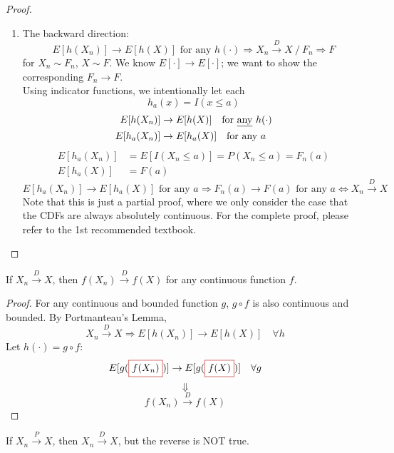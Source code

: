 \begin{proof}
\begin{enumerate}
        \item The backward direction:
        \[E[h(X_n)] \to E[h(X)] \text{ for any } h(\cdot) \Rightarrow X_n \overset{D}{\longrightarrow} X \ / \ F_n \Rightarrow F\]
        for $X_n \sim F_n$, $X \sim F$.
        We know $E[\cdot] \to E[\cdot]$; we want to show the corresponding $F_n \to F$.
        \\Using indicator functions, we intentionally let each
        \[h_a(x) = I(x \leq a)\]
        \begin{align*}
            E[h(X_n)] &\to E[h(X)] \quad \text{for \underline{any} } h(\cdot)\\
            E[h_a(X_n)] &\to E[h_a(X)] \quad \text{for any } a
        \end{align*}
        \begin{align*}
            E[h_a(X_n)] &= E[I(X_n \leq a)] = P(X_n \leq a) = F_n(a)\\
            E[h_a(X)] &= F(a)
        \end{align*}
        \[E[h_a(X_n)] \to E[h_a(X)] \text{ for any } a \Rightarrow F_n(a) \to F(a) \text{ for any } a \Leftrightarrow X_n \overset{D}{\longrightarrow} X\]
        Note that this is just a partial proof, where we only consider the case that the CDFs are always absolutely continuous. For the complete proof, please refer to the 1st recommended textbook.
    \end{enumerate}
\end{proof}

\begin{corollary}
    If $X_n \overset{D}{\longrightarrow} X$, then $f(X_n) \overset{D}{\longrightarrow} f(X)$ for any continuous function $f$.
    \begin{proof}
        For any continuous and bounded function $g$, $g \circ f$ is also continuous and bounded. By Portmanteau's Lemma,
        \[X_n \overset{D}{\longrightarrow} X \Rightarrow E[h(X_n)] \to E[h(X)] \quad \forall h\]
        Let $h(\cdot) = g \circ f$:
        \[E[g(\fcolorbox{red!70!black}{white}{$f(X_n)$})] \to E[g(\fcolorbox{red!70!black}{white}{$f(X)$})] \quad \forall g\]
        \[\Downarrow\]
        \[f(X_n) \overset{D}{\longrightarrow} f(X)\]
    \end{proof}
\end{corollary}

\begin{corollary}[][7.3.2]
    If $X_n \overset{P}{\longrightarrow} X$, then $X_n \overset{D}{\longrightarrow} X$, but the reverse is NOT true.
\end{corollary}
